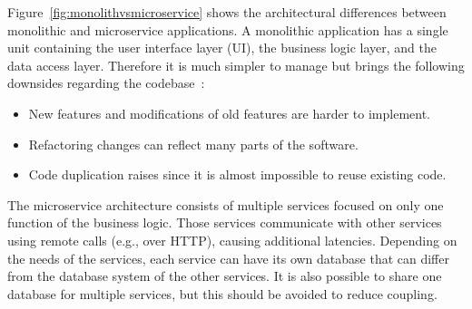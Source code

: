 Figure~\ref{fig:monolithvsmicroservice} shows the architectural differences between monolithic and microservice applications.
A monolithic application has a single unit containing the user interface layer (UI), the business logic layer, and the data access layer.
Therefore it is much simpler to manage but brings the following downsides regarding the codebase~\cite{kalske2017challenges}:
\begin{itemize}
    \item New features and modifications of old features are harder to implement.
    \item Refactoring changes can reflect many parts of the software.
    \item Code duplication raises since it is almost impossible to reuse existing code.
\end{itemize}
The microservice architecture consists of multiple services focused on only one function of the business logic.
Those services communicate with other services using remote calls (e.g., over HTTP), causing additional latencies.
Depending on the needs of the services, each service can have its own database that can differ from the database system of the other services.
It is also possible to share one database for multiple services, but this should be avoided to reduce coupling. 

